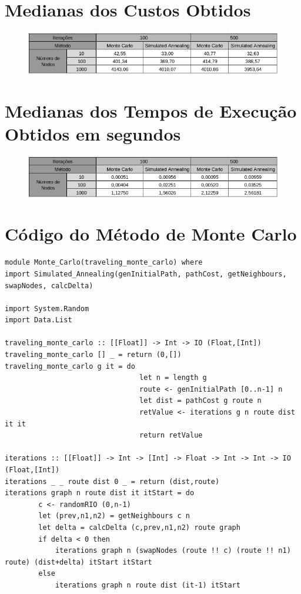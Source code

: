 \documentclass{article}
\begin{document}
\begin{appendices}

\section{Medianas dos Custos Obtidos}
\begin{figure}[H]
    \centering
    \includegraphics[width=13cm]{Pictures/custoTab.png}
\end{figure}

\section{Medianas dos Tempos de Execução Obtidos em segundos}
\begin{figure}[H]
    \centering
    \includegraphics[width=13cm]{Pictures/tempoTab.png}
\end{figure}

\section{Código do Método de Monte Carlo}

\small
\begin{framed}
\begin{verbatim}
module Monte_Carlo(traveling_monte_carlo) where
import Simulated_Annealing(genInitialPath, pathCost, getNeighbours, swapNodes, calcDelta)

import System.Random
import Data.List

traveling_monte_carlo :: [[Float]] -> Int -> IO (Float,[Int])
traveling_monte_carlo [] _ = return (0,[])
traveling_monte_carlo g it = do
                                let n = length g
                                route <- genInitialPath [0..n-1] n
                                let dist = pathCost g route n
                                retValue <- iterations g n route dist it it
                                return retValue

iterations :: [[Float]] -> Int -> [Int] -> Float -> Int -> Int -> IO (Float,[Int])
iterations _ _ route dist 0 _ = return (dist,route)
iterations graph n route dist it itStart = do
        c <- randomRIO (0,n-1)
        let (prev,n1,n2) = getNeighbours c n
        let delta = calcDelta (c,prev,n1,n2) route graph
        if delta < 0 then
            iterations graph n (swapNodes (route !! c) (route !! n1) route) (dist+delta) itStart itStart
        else
            iterations graph n route dist (it-1) itStart
\end{verbatim}
\end{framed}


\end{appendices}
\end{document}
